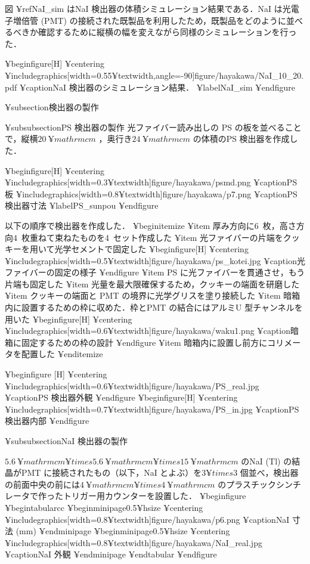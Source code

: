 図 ¥ref{NaI_sim} はNaI 検出器の体積シミュレーション結果である．NaI は光電子増倍管 (PMT) の接続された既製品を利用したため，既製品をどのように並べるべきか確認するために縦横の幅を変えながら同様のシミュレーションを行った．

¥begin{figure}[H]
¥centering
¥includegraphics[width=0.55¥textwidth,angle=-90]{figure/hayakawa/NaI_10_20.pdf}
¥caption{NaI 検出器のシミュレーション結果．}
¥label{NaI_sim}
¥end{figure}

¥subsection{検出器の製作}

¥subsubsection{PS 検出器の製作}
光ファイバー読み出しの PS の板を並べることで，縦横$20~¥mathrm{cm}$ ，奥行き$24~¥mathrm{cm}$ の体積のPS 検出器を作成した．

¥begin{figure}[H]
¥centering
¥includegraphics[width=0.3¥textwidth]{figure/hayakawa/psmd.png}
¥caption{PS 板}
¥includegraphics[width=0.8¥textwidth]{figure/hayakawa/p7.png}
¥caption{PS 検出器寸法}
¥label{PS_sunpou}
¥end{figure}

以下の順序で検出器を作成した．
¥begin{itemize}
¥item 厚み方向に6~枚，高さ方向4~枚重ねて束ねたものを4~セット作成した
¥item 光ファイバーの片端をクッキーを用いて光学セメントで固定した
¥begin{figure}[H]
¥centering
¥includegraphics[width=0.5¥textwidth]{figure/hayakawa/ps_kotei.jpg}
¥caption{光ファイバーの固定の様子}
¥end{figure}
¥item PS に光ファイバーを貫通させ，もう片端も固定した
¥item 光量を最大限確保するため，クッキーの端面を研磨した
¥item クッキーの端面と PMT の境界に光学グリスを塗り接続した
¥item 暗箱内に設置するための枠に収めた．枠とPMT の結合にはアルミU 型チャンネルを用いた
¥begin{figure}[H]
¥centering
¥includegraphics[width=0.6¥textwidth]{figure/hayakawa/waku1.png}
¥caption{暗箱に固定するための枠の設計}
¥end{figure}
¥item 暗箱内に設置し前方にコリメータを配置した
¥end{itemize}

¥begin{figure} [H]
¥centering
¥includegraphics[width=0.6¥textwidth]{figure/hayakawa/PS_real.jpg}
¥caption{PS 検出器外観}
¥end{figure}
¥begin{figure}[H]
¥centering
¥includegraphics[width=0.7¥textwidth]{figure/hayakawa/PS_in.jpg}
¥caption{PS検出器内部}
¥end{figure}

¥subsubsection{NaI 検出器の製作}

$5.6~¥mathrm{cm}¥times 5.6~¥mathrm{cm}¥times 15~¥mathrm{cm}$ のNaI (Tl) の結晶がPMT に接続されたもの（以下，NaI とよぶ）を$3¥times 3$ 個並べ，検出器の前面中央の前には$4~¥mathrm{cm} ¥times 4~¥mathrm{cm}$ のプラスチックシンチレータで作ったトリガー用カウンターを設置した．
¥begin{figure}
¥begin{tabular}{cc}
¥begin{minipage}{0.5¥hsize}
¥centering
¥includegraphics[width=0.8¥textwidth]{figure/hayakawa/p6.png}
¥caption{NaI 寸法 (mm)}
¥end{minipage}
¥begin{minipage}{0.5¥hsize}
¥centering
¥includegraphics[width=0.8¥textwidth]{figure/hayakawa/NaI_real.jpg}
¥caption{NaI 外観}
¥end{minipage}
¥end{tabular}
¥end{figure}

